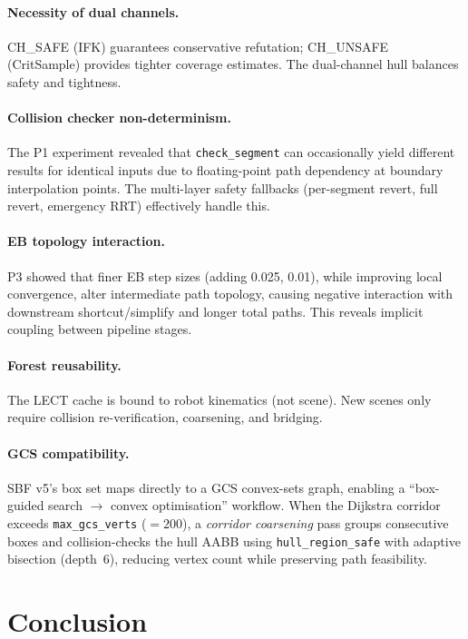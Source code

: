 \documentclass[journal]{IEEEtran}
\begin{document}
\paragraph{Necessity of dual channels.}
CH\_SAFE (IFK) guarantees conservative refutation; CH\_UNSAFE
(CritSample) provides tighter coverage estimates.
The dual-channel hull balances safety and tightness.

\paragraph{Collision checker non-determinism.}
The P1 experiment revealed that \texttt{check\_segment} can
occasionally yield different results for identical inputs due to
floating-point path dependency at boundary interpolation points.
The multi-layer safety fallbacks (per-segment revert, full revert,
emergency RRT) effectively handle this.

\paragraph{EB topology interaction.}
P3 showed that finer EB step sizes (adding 0.025, 0.01), while
improving local convergence, alter intermediate path topology,
causing negative interaction with downstream shortcut/simplify
and longer total paths.
This reveals implicit coupling between pipeline stages.

\paragraph{Forest reusability.}
The LECT cache is bound to robot kinematics (not scene).
New scenes only require collision re-verification, coarsening,
and bridging.

\paragraph{GCS compatibility.}
SBF v5's box set maps directly to a GCS convex-sets graph,
enabling a ``box-guided search $\to$ convex optimisation'' workflow.
When the Dijkstra corridor exceeds \texttt{max\_gcs\_verts} ($=200$),
a \emph{corridor coarsening} pass groups consecutive boxes and
collision-checks the hull AABB using \texttt{hull\_region\_safe}
with adaptive bisection (depth~6), reducing vertex count while
preserving path feasibility.

\section{Conclusion}\label{sec:conclusion}
\end{document}
